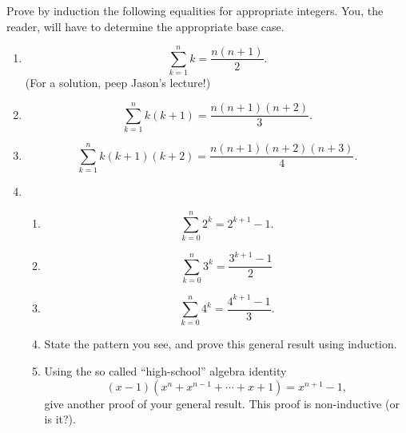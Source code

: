Prove by induction the following equalities for appropriate integers. You, the reader, will have to determine the appropriate base case.
\begin{enumerate}
    \item \[\sum_{k = 1}^nk = \frac{n(n + 1)}{2}.\] (For a solution, peep Jason's lecture!)
    \item \[\sum_{k = 1}^nk(k + 1) = \frac{n(n + 1)(n + 2)}{3}.\]
    \item \[\sum_{k = 1}^nk(k + 1)(k + 2) = \frac{n(n + 1)(n + 2)(n + 3)}{4}.\]
    \item
    
    \begin{enumerate}
        \item \[\sum_{k = 0}^n2^k = 2^{k + 1} - 1.\]
        \item \[\sum_{k = 0}^n3^k = \frac{3^{k + 1} - 1}{2}\]
        \item \[\sum_{k = 0}^n4^k = \frac{4^{k + 1} - 1}{3}.\]
        \item State the pattern you see, and prove this general result using induction.
        \item Using the so called ``high-school'' algebra identity
        \[(x - 1)(x^n + x^{n-1} + \cdots + x + 1) = x^{n + 1} - 1,\] give another proof of your general result. This proof is non-inductive (or is it?).
    \end{enumerate}
\end{enumerate}